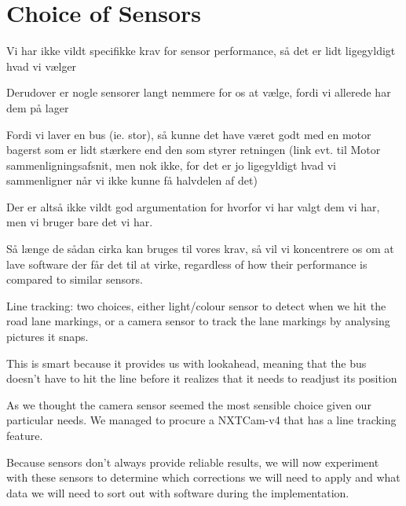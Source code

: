 
\section{Choice of Sensors}

Vi har ikke vildt specifikke krav for sensor performance, så det er lidt ligegyldigt hvad vi vælger

Derudover er nogle sensorer langt nemmere for os at vælge, fordi vi allerede har dem på lager

Fordi vi laver en bus (ie. stor), så kunne det have været godt med en motor bagerst som er lidt stærkere end den som styrer retningen (link evt. til Motor sammenligningsafsnit, men nok ikke, for det er jo ligegyldigt hvad vi sammenligner når vi ikke kunne få halvdelen af det)

Der er altså ikke vildt god argumentation for hvorfor vi har valgt dem vi har, men vi bruger bare det vi har.

Så længe de sådan cirka kan bruges til vores krav, så vil vi koncentrere os om at lave software der får det til at virke, regardless of how their performance is compared to similar sensors.

Line tracking: two choices, either light/colour sensor to detect when we hit the road lane markings, or a camera sensor to track the lane markings by analysing pictures it snaps. 

This is smart because it provides us with lookahead, meaning that the bus doesn't have to hit the line before it realizes that it needs to readjust its position

As we thought the camera sensor seemed the most sensible choice given our particular needs. We managed to procure a NXTCam-v4 that has a line tracking feature.



Because sensors don't always provide reliable results, we will now experiment with these sensors to determine which corrections we will need to apply and what data we will need to sort out with software during the implementation. 
